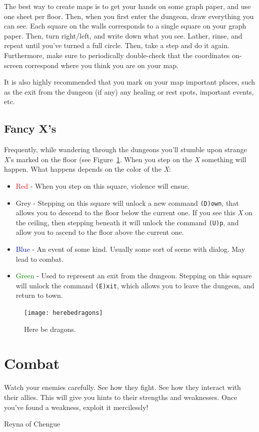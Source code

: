 \documentclass{report}
\begin{document}
    The best way to create maps is to get your hands on some graph paper, and
    use one sheet per floor. Then, when you first enter the dungeon, draw
    everything you can see. Each square on the walls corresponds to a single 
    square on your graph paper. Then, turn right/left, and write down what you
    see. Lather, rinse, and repeat until you've turned a full circle. Then, take a 
    step and do it again. Furthermore, make sure to periodically double-check
    that the coordinates on-screen correspond where you think you are on your map.

    It is also highly recommended that you mark on your map important places,
    such as the exit from the dungeon (if any) any healing or rest spots, important
    events, etc.

\section{Fancy X's}
Frequently, while wandering through the dungeons you'll stumble upon strange \emph{X}'s marked on the floor (see Figure~\ref{fig_x}. When you step on the \emph{X} something will happen. What happens
depends on the color of the \emph{X}:

\begin{itemize}
    \item \textcolor{red}{Red} - When you step on this square, violence will ensue.
    \item Grey - Stepping on this square will unlock a new command \verb|(D)own|, that allows you to descend to the floor below the current one. If you see this \emph{X} on the ceiling, 
        then stepping
        beneath it will unlock the command \verb|(U)p|, and allow you to ascend to the floor above the current one.
    \item \textcolor{blue}{Blue} - An event of some kind. Usually some sort of scene with dialog. May lead to combat.
    \item \textcolor{green}{Green} - Used to represent an exit from the dungeon. Stepping on this square will unlock the command \verb|(E)xit|, which allows you to leave the dungeon, and return to
        town.
\end{itemize}

\begin{figure}[h!]
    \texttt{[image: herebedragons]}
    \caption{Here be dragons.}
    \label{fig_x}
\end{figure}
    

\chapter{Combat}
\label{ch_combat}
\epigraph{Watch your enemies carefully. See how they fight. See how
they interact with their allies. This will give you hints to their strengths and
weaknesses. Once you've found a weakness, exploit it mercilessly!}{Reyna of 
Chengue} 
\end{document}
